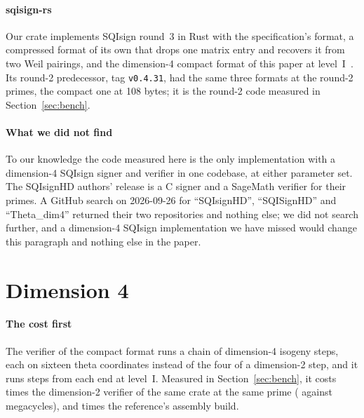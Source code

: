 \documentclass[11pt]{article}
\begin{document}
\paragraph{sqisign-rs}
Our crate implements SQIsign round~3 in Rust with the specification's
format, a compressed format of its own that drops one matrix entry and
recovers it from two Weil pairings, and the dimension-4 compact format of
this paper at level~I~\cite{SqisignRs}.  Its round-2 predecessor, tag
\texttt{v0.4.31}, had the same three formats at the round-2 primes, the
compact one at 108 bytes; it is the round-2 code measured in
Section~\ref{sec:bench}.

\paragraph{What we did not find}
To our knowledge the code measured here is the only implementation with a
dimension-4 SQIsign signer and verifier in one codebase, at either
parameter set.  The SQIsignHD authors' release is a C signer and a
SageMath verifier for their primes.  A GitHub search on 2026-09-26 for
``SQIsignHD'', ``SQISignHD'' and ``Theta\_dim4'' returned their two
repositories and nothing else; we did not search further, and a
dimension-4 SQIsign implementation we have missed would change this
paragraph and nothing else in the paper.

\section{Dimension 4}
\label{sec:dim4}

\paragraph{The cost first}
The verifier of the compact format runs a chain of dimension-4 isogeny
steps, each on sixteen theta coordinates instead of the four of a
dimension-2 step, and it runs \HalfStepsI{} steps from each end at
level~I.  Measured in Section~\ref{sec:bench}, it costs \VerMultI{} times
the dimension-2 verifier of the same crate at the same prime
(\VerCompactI{} against \VerStdI{} megacycles), and \VerMultCrefI{} times
the reference's assembly build.
\end{document}
